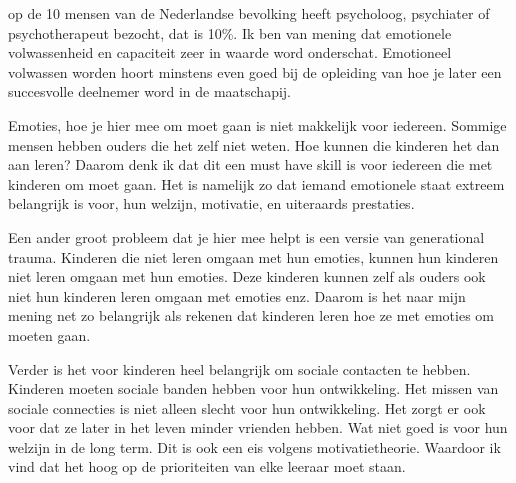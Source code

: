              op de 10 mensen van de Nederlandse bevolking heeft psycholoog, psychiater of psychotherapeut bezocht, dat is 10\%.\cite{1-in-10-pygy} Ik ben van mening dat emotionele volwassenheid en capaciteit zeer in waarde word onderschat. Emotioneel volwassen worden hoort minstens even goed bij de opleiding van hoe je later een succesvolle deelnemer word in de maatschapij.
            
            \bigskip
        
            \noindent Emoties, hoe je hier mee om moet gaan is niet makkelijk voor iedereen. Sommige mensen hebben ouders die het zelf niet weten. Hoe kunnen die kinderen het dan aan leren? Daarom denk ik dat dit een must have skill is voor iedereen die met kinderen om moet gaan. Het is namelijk zo dat iemand emotionele staat extreem belangrijk is voor, hun welzijn, motivatie, en uiteraards prestaties. 
            
            \bigskip
        
            \noindent Een ander groot probleem dat je hier mee helpt is een versie van generational trauma. Kinderen die niet leren omgaan met hun emoties, kunnen hun kinderen niet leren omgaan met hun emoties. Deze kinderen kunnen zelf als ouders ook niet hun kinderen leren omgaan met emoties enz. Daarom is het naar mijn mening net zo belangrijk als rekenen dat kinderen leren hoe ze met emoties om moeten gaan.
            
            \bigskip
        
            \noindent Verder is het voor kinderen heel belangrijk om sociale contacten te hebben. Kinderen moeten sociale banden hebben voor hun ontwikkeling.\cite{social-isolation-affect-a-childs-mental-health-and-development} Het missen van sociale connecties is niet alleen slecht voor hun ontwikkeling. Het zorgt er ook voor dat ze later in het leven minder vrienden hebben. Wat niet goed is voor hun welzijn in de long term. Dit is ook een eis volgens motivatietheorie. Waardoor ik vind dat het hoog op de prioriteiten van elke leeraar moet staan.

    \newpage

